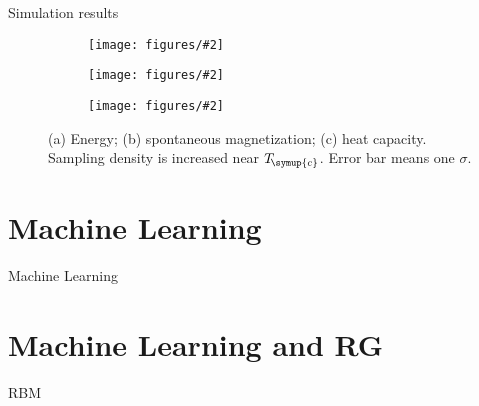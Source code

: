 \documentclass[aspectratio=169]{beamer}
\def\Tc{T_{\!\symup{c}}}
\newcommand\imageinput[2][]{\texttt{[image: figures/\#2]}}
\begin{document}
\begin{frame}{Simulation results}
\begin{figure}
  \centering
  \begin{subfigure}[b]{0.32\textwidth}
    \centering
    \imageinput[height=3.4cm]{ising-energy}
  \end{subfigure}
  \begin{subfigure}[b]{0.32\textwidth}
    \centering
    \imageinput[height=3.4cm]{ising-magnet}
  \end{subfigure}
  \begin{subfigure}[b]{0.32\textwidth}
    \centering
    \imageinput[height=3.4cm]{ising-cv}
  \end{subfigure}
  \caption{(a) Energy; (b) spontaneous magnetization; (c) heat capacity.
    Sampling density is increased near $\Tc$. Error bar means one $\sigma$.}
\end{figure}
\end{frame}

\section{Machine Learning}

\begin{frame}{Machine Learning}
  
\end{frame}

\section{Machine Learning and RG}

\begin{frame}{RBM}
  
\end{frame}
\end{document}
